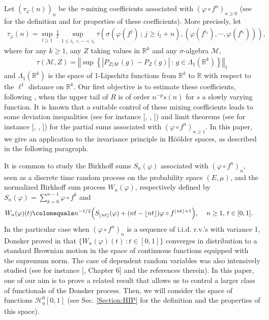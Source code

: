 \documentclass{ws-sd}
\newcommand{\R}{\mathbb{R}}
\newcommand{\norm}[1]{\left\Vert #1\right\Vert}
\newcommand{\abs}[1]{\left\lvert #1 \right\rvert}
\newcommand{\eqdef}{\colonequals}
\newcommand\bigp[1]{\left(#1\right)}
\renewcommand{\geq}{\geqslant}
\begin{document}
Let $(\tau_\varphi(n))_n$ be the $\tau$-mixing coefficients associated with $(\varphi \circ f^n)_{n \geq 0}$ (see \cite{10} for the definition and for properties of these coefficients). More precisely, let
\begin{align*}
    \tau_\varphi (n) = \underset{l \ge 1}{\sup} \, \frac{1}{l} \underset{1 \le i_1<\cdots<i_l}{\sup} \tau\bigp{\sigma(\varphi(f^j) \, ; \, j \ge i_l + n), (\varphi(f^{i_1}), \cdots, \varphi(f^{i_l}))},
\end{align*}
where for any $k \ge 1$, any $Z$ taking values in $\R^k$ and any $\sigma$-algebra $\mathcal M$,
\begin{align*}
    \tau(\mathcal M, Z)
    =
    \norm{
        \sup\left\{
            \abs{P_{Z|\mathcal M}(g) - P_Z(g)} \, : \, g \in \Lambda_1(\R^k)
        \right\}
    }_1
\end{align*}
and $\Lambda_1(\R^k)$ is the space of 1-Lipschitz functions from $\R^k$ to $\R$
with respect to the $\ell^1$ distance on $\R^k$.
Our first objective is to estimate these coefficients, following \cite{6}, when the upper tail of $R$ is of order $n^{-p}s(n)$ for $s$ a slowly varying function.
It is known that a suitable control of these mixing coefficients leads to some deviation inequalities (see for instance [, , ]) and limit theorems (see for instance [, , ]) for the partial sums associated with $(\varphi \circ f^n)_{n \ge 1}$. In this paper, we give an application to the invariance principle in Hö\"older spaces, as described in the following paragraph.
\\


It is common to study the Birkhoff sums $S_n(\varphi)$ associated with $(\varphi \circ f^n)_n$, seen as a discrete time random process on the probability space $(E, \mu)$, and the normalized Birkhoff sum process $W_n(\varphi)$, respectively defined by $S_n(\varphi) = \sum_{k =0}^{n - 1} \varphi \circ f^k$ and
\begin{align}
    \label{def:Wn_phi}
    &W_n(\varphi)(t) \eqdef n^{-1/2}\Big(S_{\lfloor nt \rfloor}(\varphi) + (nt - \lfloor nt \rfloor) \varphi \circ f^{\lfloor nt \rfloor + 1}\Big) ,
    \quad
    \, n \ge 1,\, t \in [0,1].
\end{align}
In the particular case when $(\varphi \circ f^n)_n$ is a sequence of i.i.d. r.v.'s with variance 1, Donsker proved in \cite{11} that $\{W_n(\varphi)(t) \, : t \in [0,1]\}$ converges in distribution to a standard Brownian motion in the space of continuous functions equipped with the supremum norm. The case of dependent random variables was also intensively studied (see for instance [, Chapter 6] and the references therein). In this paper, one of our aim is to prove a related result that allows us to control a larger class of functionals of the Donsker process. Then, we will consider the space of functions $\mathcal H _\eta^0 [0,1]$ (see Sec. \ref{Section:HIP} for the definition and the properties of this space).
\end{document}
